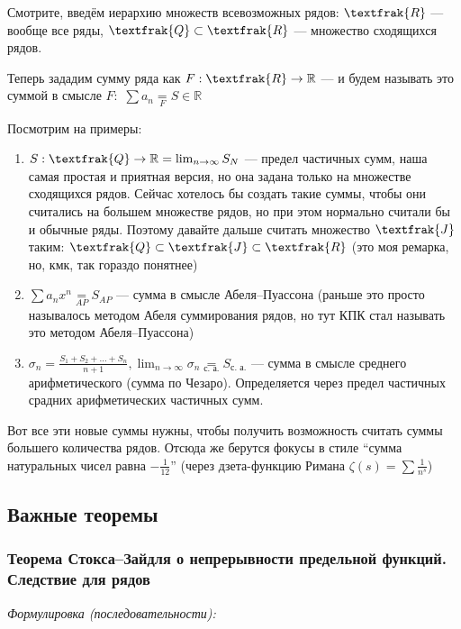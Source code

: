 \documentclass{article}
\def\dbl{\,\,}
\def\eqby#1{\underset{#1}{=}}
\begin{document}
Смотрите, введём иерархию множеств всевозможных рядов: $\textfrak{R}$ --- вообще все ряды, $\textfrak{Q} \subset \textfrak{R}$ --- множество сходящихся рядов.

Теперь зададим сумму ряда как $F: \textfrak{R} \rightarrow \mathbb{R}$ --- и будем называть это суммой в смысле $F: \dbl \sum a_n \eqby{F} S \in \mathbb{R}$

Посмотрим на примеры: 

\begin{enumerate}
    \item $S: \textfrak{Q} \rightarrow \mathbb{R} = \lim_{n \rightarrow \infty} S_N$ --- предел частичных сумм, наша самая простая и приятная версия, но она задана только на множестве сходящихся рядов. Сейчас хотелось бы создать такие суммы, чтобы они считались на большем множестве рядов, но при этом нормально считали бы и обычные ряды. Поэтому давайте дальше считать множество $\textfrak{J}$ таким: $\textfrak{Q} \subset \textfrak{J} \subset \textfrak{R}$ (это моя ремарка, но, кмк, так гораздо понятнее)
    \item $\sum a_n x^n \eqby{AP} S_{AP}$ --- сумма в смысле Абеля--Пуассона (раньше это просто называлось методом Абеля суммирования рядов, но тут КПК стал называть это методом Абеля--Пуассона)
    \item $\sigma_n = \frac{S_1 + S_2 + \ldots + S_n}{n + 1}, \lim_{n \rightarrow \infty} \sigma_n \eqby{\text{с. а.}} S_{\text{с. а.}}$ --- сумма в смысле среднего арифметического (сумма по Чезаро). Определяется через предел частичных срадних арифметических частичных сумм.
\end{enumerate}

Вот все эти новые суммы нужны, чтобы получить возможность считать суммы большего количества рядов. Отсюда же берутся фокусы в стиле ``сумма натуральных чисел равна $-\frac{1}{12}$'' (через дзета-функцию Римана $\zeta(s) = \sum \frac{1}{n^s}$)

\newpage

\subsection{Важные теоремы}

\subsubsection{Теорема Стокса--Зайдля о непрерывности предельной функций. Следствие для рядов}

\textit{Формулировка (последовательности):}
\end{document}
